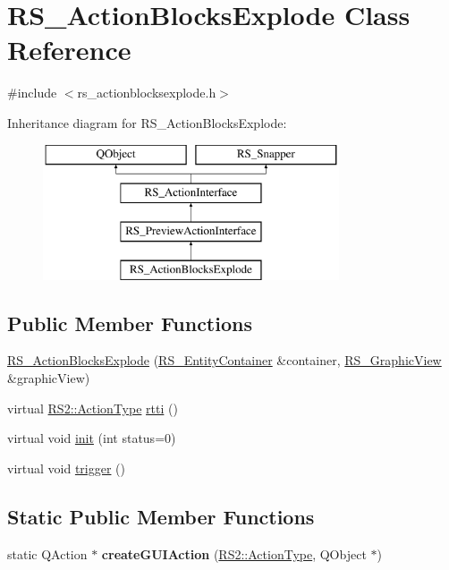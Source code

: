 \hypertarget{classRS__ActionBlocksExplode}{\section{R\-S\-\_\-\-Action\-Blocks\-Explode Class Reference}
\label{classRS__ActionBlocksExplode}
}


{\ttfamily \#include $<$rs\-\_\-actionblocksexplode.\-h$>$}

Inheritance diagram for R\-S\-\_\-\-Action\-Blocks\-Explode\-:\begin{figure}[H]
\begin{center}
\leavevmode
\includegraphics[height=4.000000cm]{classRS__ActionBlocksExplode}
\end{center}
\end{figure}
\subsection*{Public Member Functions}
\begin{DoxyCompactItemize}
\item 
\hyperlink{classRS__ActionBlocksExplode_aafafb4f38990df196cf5f28b8a4d64da}{R\-S\-\_\-\-Action\-Blocks\-Explode} (\hyperlink{classRS__EntityContainer}{R\-S\-\_\-\-Entity\-Container} \&container, \hyperlink{classRS__GraphicView}{R\-S\-\_\-\-Graphic\-View} \&graphic\-View)
\item 
virtual \hyperlink{classRS2_afe3523e0bc41fd637b892321cfc4b9d7}{R\-S2\-::\-Action\-Type} \hyperlink{classRS__ActionBlocksExplode_a0af931cb420f1d87e25bd52156534527}{rtti} ()
\item 
virtual void \hyperlink{classRS__ActionBlocksExplode_a5053d0d7013d1a12d13d260b0319d01f}{init} (int status=0)
\item 
virtual void \hyperlink{classRS__ActionBlocksExplode_afe1a1c463470a95b7eb7f007bdc4d629}{trigger} ()
\end{DoxyCompactItemize}
\subsection*{Static Public Member Functions}
\begin{DoxyCompactItemize}
\item 
\hypertarget{classRS__ActionBlocksExplode_ae15956a52ab4467cce44d4fef0adbc7a}{static Q\-Action $\ast$ {\bfseries create\-G\-U\-I\-Action} (\hyperlink{classRS2_afe3523e0bc41fd637b892321cfc4b9d7}{R\-S2\-::\-Action\-Type}, Q\-Object $\ast$)}\label{classRS__ActionBlocksExplode_ae15956a52ab4467cce44d4fef0adbc7a}

\end{DoxyCompactItemize}
